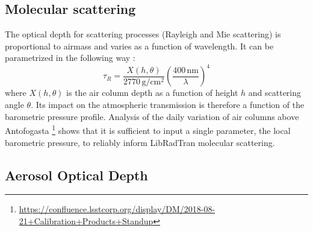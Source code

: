 \documentclass[DM,authoryear,toc,lsstdraft]{lsstdoc}
\begin{document}
\subsection{Molecular scattering}


The optical depth for scattering processes (Rayleigh and Mie scattering) is proportional to airmass and varies as a function of wavelength. It can be parametrized in the following way :
\begin{equation}
\tau_R = \frac{X(h, \theta)}{ 2770\,\mathrm{g}/\mathrm{cm}^2} \left( \frac{400\,\mathrm{nm}}{\lambda} \right)^4
\end{equation}
where $X(h, \theta)$ is the air column depth as a function of height $h$ and scattering angle $\theta$.
Its impact on the atmospheric transmission is therefore a function of the barometric pressure profile. Analysis of the daily variation of air columns above Antofogasta \footnote{\url{https://confluence.lsstcorp.org/display/DM/2018-08-21+Calibration+Products+Standup}} shows that it is sufficient to input a single parameter, the local barometric pressure, to reliably inform LibRadTran molecular scattering. 


\subsection{Aerosol Optical Depth}
\end{document}
